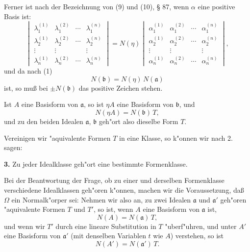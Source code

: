 \documentclass[12pt,a4paper]{article}
\theoremstyle{plain}
\begin{document}
Ferner ist nach der Bezeichnung von (9) und (10), \S{} 87, wenn $\alpha$ eine positive Basis ist:
\[
\begin{vmatrix}
\lambda_1^{(1)} & \lambda_1^{(2)} & \cdots & \lambda_1^{(n)} \\
\lambda_2^{(1)} & \lambda_2^{(2)} & \cdots & \lambda_2^{(n)} \\
\vdots & \vdots & & \vdots \\
\lambda_n^{(1)} & \lambda_n^{(2)} & \cdots & \lambda_n^{(n)}
\end{vmatrix}
= N(\eta)
\begin{vmatrix}
\alpha_1^{(1)} & \alpha_1^{(2)} & \cdots & \alpha_1^{(n)} \\
\alpha_2^{(1)} & \alpha_2^{(2)} & \cdots & \alpha_2^{(n)} \\
\vdots & \vdots & & \vdots \\
\alpha_n^{(1)} & \alpha_n^{(2)} & \cdots & \alpha_n^{(n)}
\end{vmatrix},
\]
und da nach (1)
\begin{equation}
N(\mathfrak{b}) = N(\eta)\,N(\mathfrak{a})
\tag{5}
\end{equation}
ist, so mu\ss{} bei $\pm N(\mathfrak{b})$ das positive Zeichen stehen.

Ist $A$ eine Basisform von $\mathfrak{a}$, so ist $\eta A$ eine Basisform von $\mathfrak{b}$, und
\begin{equation}
N(\eta A) = N(\mathfrak{b})\,T,
\tag{6}
\end{equation}
und zu den beiden Idealen $\mathfrak{a}$, $\mathfrak{b}$ geh"ort also dieselbe Form $T$.

Vereinigen wir "aquivalente Formen $T$ in eine Klasse, so k"onnen wir nach 2. sagen:

\textbf{3.} Zu jeder Idealklasse geh"ort eine bestimmte Formenklasse.

Bei der Beantwortung der Frage, ob zu einer und derselben Formenklasse verschiedene Idealklassen geh"oren k"onnen, machen wir die Voraussetzung, da\ss{} $\Omega$ ein Normalk"orper sei: Nehmen wir also an, zu zwei Idealen $\mathfrak{a}$ und $\mathfrak{a}'$ geh"oren "aquivalente Formen $T$ und $T'$, so ist, wenn $A$ eine Basisform von $\mathfrak{a}$ ist,
\begin{equation}
N(A) = N(\mathfrak{a})\,T,
\tag{7}
\end{equation}
und wenn wir $T'$ durch eine lineare Substitution in $T$ "uberf"uhren, und unter $A'$ eine Basisform von $\mathfrak{a}'$ (mit denselben Variablen $t$ wie $A$) verstehen, so ist
\begin{equation}
N(A') = N(\mathfrak{a}')\,T.
\tag{8}
\end{equation}
\end{document}
